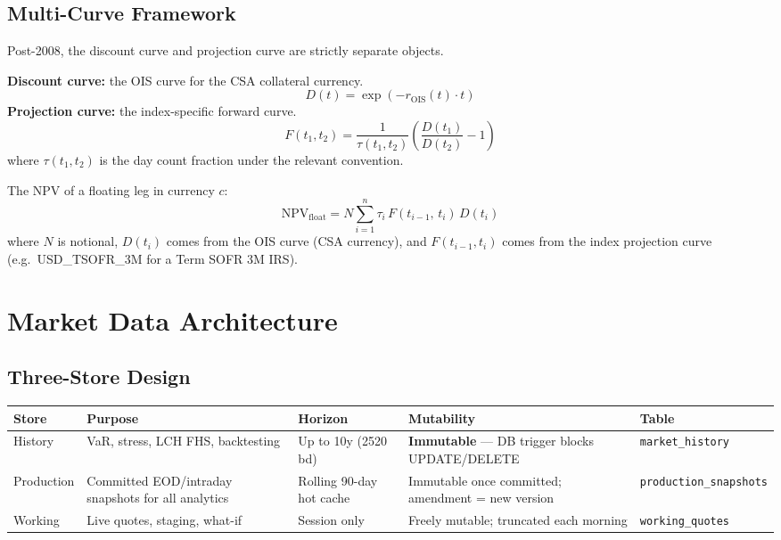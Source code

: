 \documentclass[11pt, a4paper]{article}
\begin{document}
\subsection{Multi-Curve Framework}

Post-2008, the discount curve and projection curve are strictly separate objects.

\begin{tcolorbox}[definition]
\textbf{Discount curve:} the OIS curve for the CSA collateral currency.
\begin{equation}
  D(t) = \exp\!\left(-r_{\mathrm{OIS}}(t)\cdot t\right)
\end{equation}
\textbf{Projection curve:} the index-specific forward curve.
\begin{equation}
  F(t_1, t_2) = \frac{1}{\tau(t_1,t_2)}
                \left(\frac{D(t_1)}{D(t_2)} - 1\right)
\end{equation}
where $\tau(t_1,t_2)$ is the day count fraction under the relevant convention.
\end{tcolorbox}

The NPV of a floating leg in currency $c$:
\begin{equation}
  \mathrm{NPV}_{\mathrm{float}} =
    N \sum_{i=1}^{n} \tau_i\, F(t_{i-1},\, t_i)\, D(t_i)
\end{equation}
where $N$ is notional, $D(t_i)$ comes from the OIS curve (CSA currency),
and $F(t_{i-1}, t_i)$ comes from the index projection curve
(e.g.\ USD\_TSOFR\_3M for a Term SOFR 3M IRS).

\section{Market Data Architecture}

\subsection{Three-Store Design}

\begin{center}
\begin{tabular}{L{2.4cm} L{3.5cm} L{2.2cm} L{2.2cm} L{2.5cm}}
\toprule
\textbf{Store} & \textbf{Purpose} & \textbf{Horizon} & \textbf{Mutability} & \textbf{Table} \\
\midrule
History    & VaR, stress, LCH FHS, backtesting
           & Up to 10y (2520 bd)
           & \textbf{Immutable} — DB trigger blocks UPDATE/DELETE
           & \texttt{market\_history} \\
\addlinespace
Production & Committed EOD/intraday snapshots for all analytics
           & Rolling 90-day hot cache
           & Immutable once committed; amendment = new version
           & \texttt{production\_snapshots} \\
\addlinespace
Working    & Live quotes, staging, what-if
           & Session only
           & Freely mutable; truncated each morning
           & \texttt{working\_quotes} \\
\bottomrule
\end{tabular}
\end{center}
\end{document}
